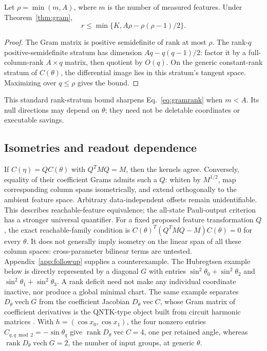 \begin{corollary}\label{cor:readoutbound}
Let $\rho=\min(m,A)$, where $m$ is the number of measured features.
Under Theorem~\ref{thm:gram},
\begin{equation}
 r\le\min\{K,A\rho-\rho(\rho-1)/2\}.
\end{equation}
\end{corollary}
\begin{proof}
The Gram matrix is positive semidefinite of rank at most $\rho$.
The rank-$q$ positive-semidefinite stratum has dimension
$Aq-q(q-1)/2$: factor it by a full-column-rank $A\times q$ matrix,
then quotient by $O(q)$. On the generic constant-rank stratum of
$C(\theta)$, the differential image lies in this stratum's tangent
space. Maximizing over $q\le\rho$ gives the bound.
\end{proof}
This standard rank-stratum bound sharpens Eq.~\eqref{eq:gramrank}
when $m<A$. Its null directions may depend on $\theta$; they need
not be deletable coordinates or executable savings.

\subsection{Isometries and readout dependence}
If $C(\eta)=Q C(\theta)$ with $Q^TMQ=M$, then the kernels agree.
Conversely, equality of their coefficient Grams admits such a $Q$:
whiten by $M^{1/2}$, map corresponding column spans isometrically,
and extend orthogonally to the ambient feature space. Arbitrary
data-independent offsets remain unidentifiable. This describes
reachable-feature equivalence; the all-state Pauli-output
criterion has a stronger universal quantifier.
For a fixed proposed feature transformation $Q$, the exact
reachable-family condition is
$C(\theta)^T(Q^TMQ-M)C(\theta)=0$ for every $\theta$.
It does not generally imply isometry on the linear span of all
these column spaces: cross-parameter bilinear terms are untested.
Appendix~\ref{app:followup} supplies a counterexample.
The Hubregtsen example below is directly represented by a diagonal
$G$ with entries $\sin^2\theta_0+\sin^2\theta_2$ and
$\sin^2\theta_1+\sin^2\theta_3$. A rank deficit need not make any
individual coordinate inactive, nor produce a global minimal chart.
The same example separates $D_\theta\operatorname{vech}G$ from the
coefficient Jacobian $D_\theta\operatorname{vec}C$, whose Gram matrix
of coefficient derivatives is the QNTK-type object built from circuit
harmonic matrices \cite{CHM}. With $h=(\cos x_0,\cos x_1)$, the four
nonzero entries $C_{q,q\bmod2}=-\sin\theta_q$ give
$\operatorname{rank}D_\theta\operatorname{vec}C=4$, one per retained
angle, whereas $\operatorname{rank}D_\theta\operatorname{vech}G=2$,
the number of input groups, at generic $\theta$.

